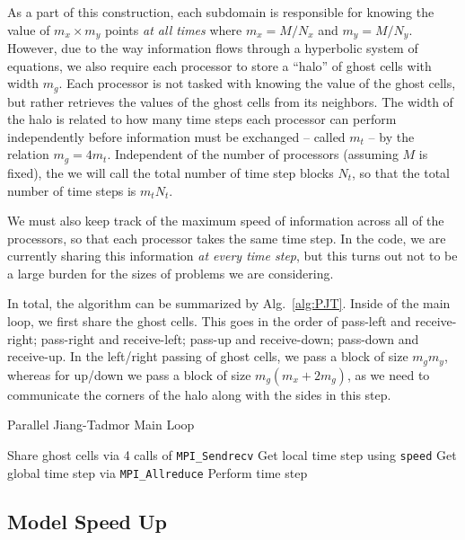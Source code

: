 \documentclass{article}
\begin{document}
As a part of this construction, each subdomain is responsible for knowing the value of $m_x \times m_y$ points \textit{at all times} where $m_x = M/N_x$ and $m_y = M/N_y$. However, due to the way information flows through a hyperbolic system of equations, we also require each processor to store a ``halo'' of ghost cells with width $m_g.$ Each processor is not tasked with knowing the value of the ghost cells, but rather retrieves the values of the ghost cells from its neighbors. The width of the halo is related to how many time steps each processor can perform independently before information must be exchanged -- called $m_t$ -- by the relation $m_g = 4 m_t$. Independent of the number of processors (assuming $M$ is fixed), the we will call the total number of time step blocks $N_t$, so that the total number of time steps is $m_t N_t$. 

We must also keep track of the maximum speed of information across all of the processors, so that each processor takes the same time step. In the code, we are currently sharing this information \textit{at every time step}, but this turns out not to be a large burden for the sizes of problems we are considering. 

In total, the algorithm can be summarized by Alg.~\ref{alg:PJT}. Inside of the main loop, we first share the ghost cells. This goes in the order of pass-left and receive-right; pass-right and receive-left; pass-up and receive-down; pass-down and receive-up. In the left/right passing of ghost cells, we pass a block of size $m_g m_y$, whereas for up/down we pass a block of size $m_g (m_x + 2m_g)$, as we need to communicate the corners of the halo along with the sides in this step. 
\begin{algorithm}
\caption{Parallel Jiang-Tadmor Main Loop}\label{alg:PJT}
\begin{algorithmic}
    \State Share ghost cells via 4 calls of \texttt{MPI\_Sendrecv}
        \State Get local time step using \texttt{speed}
        \State Get global time step via \texttt{MPI\_Allreduce}
        \State Perform time step
    \EndFor
\EndFor
\end{algorithmic}
\end{algorithm}

\subsection{Model Speed Up}
\end{document}
